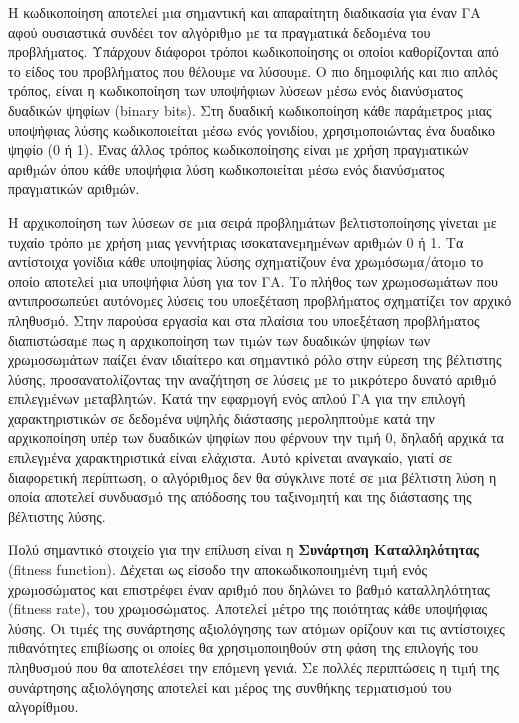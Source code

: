  Η κωδικοποίηση αποτελεί µια σηµαντική και απαραίτητη διαδικασία για έναν ΓΑ αφού ουσιαστικά συνδέει τον αλγόριθµο µε τα πραγµατικά δεδοµένα του προβλήµατος. Υπάρχουν διάφοροι τρόποι κωδικοποίησης οι οποίοι καθορίζονται από το είδος του προβλήµατος που θέλουµε να λύσουµε. Ο πιο δηµοφιλής και πιο απλός τρόπος, είναι η κωδικοποίηση των υποψήφιων λύσεων µέσω ενός διανύσµατος δυαδικών ψηφίων (binary bits). Στη δυαδική κωδικοποίηση κάθε παράµετρος µιας υποψήφιας λύσης κωδικοποιείται µέσω ενός γονιδίου, χρησιµοποιώντας ένα δυαδικο ψηφίο (0 ή 1). Ένας άλλος τρόπος κωδικοποίησης είναι µε χρήση πραγµατικών αριθµών όπου κάθε υποψήφια λύση κωδικοποιείται µέσω ενός διανύσµατος πραγµατικών αριθµών.
 
 Η αρχικοποίηση των λύσεων σε µια σειρά προβληµάτων βελτιστοποίησης γίνεται µε τυχαίο τρόπο µε χρήση µιας γεννήτριας ισοκατανεµηµένων αριθµών 0 ή 1. Τα αντίστοιχα γονίδια κάθε υποψηφίας λύσης σχηµατίζουν ένα χρωµόσωµα/άτοµο το οποίο αποτελεί µια υποψήφια λύση για τον ΓΑ. Το πλήθος των χρωµοσωµάτων που αντιπροσωπεύει αυτόνοµες λύσεις του υποεξέταση προβλήµατος σχηµατίζει τον αρχικό πληθυσµό. Στην παρούσα εργασία και στα πλαίσια του υποεξέταση προβλήµατος διαπιστώσαµε πως η αρχικοποίηση των τιµών των δυαδικών ψηφίων των χρωµοσωµάτων παίζει έναν ιδιαίτερο και σηµαντικό ρόλο στην εύρεση της βέλτιστης λύσης, προσανατολίζοντας την αναζήτηση σε λύσεις µε το µικρότερο δυνατό αριθµό επιλεγµένων µεταβλητών. Κατά την εφαρµογή ενός απλού ΓΑ για την επιλογή χαρακτηριστικών σε δεδοµένα υψηλής διάστασης µεροληπτούµε κατά την αρχικοποίηση υπέρ των δυαδικών ψηφίων που φέρνουν την τιµή 0, δηλαδή αρχικά τα επιλεγµένα χαρακτηριστικά είναι ελάχιστα. Αυτό κρίνεται αναγκαίο, γιατί σε διαφορετική περίπτωση, ο αλγόριθµος δεν θα σύγκλινε ποτέ σε µια βέλτιστη λύση η οποία αποτελεί συνδυασµό της απόδοσης του ταξινοµητή και της διάστασης της βέλτιστης λύσης.
 
 \label{fFunction}
 Πολύ σημαντικό στοιχείο για την επίλυση είναι η \textbf{Συνάρτηση Καταλληλότητας} (fitness function). ∆έχεται ως είσοδο την αποκωδικοποιηµένη τιµή ενός χρωµοσώµατος και επιστρέφει έναν αριθµό που δηλώνει το βαθµό καταλληλότητας (fitness rate), του χρωµοσώµατος. Αποτελεί µέτρο της ποιότητας κάθε υποψήφιας λύσης. Οι τιµές της
 συνάρτησης αξιολόγησης των ατόµων ορίζουν και τις αντίστοιχες πιθανότητες επιβίωσης οι οποίες θα χρησιµοποιηθούν στη φάση της επιλογής του πληθυσµού που θα αποτελέσει την επόµενη γενιά. Σε πολλές περιπτώσεις η τιµή της συνάρτησης αξιολόγησης αποτελεί και µέρος της συνθήκης τερµατισµού του αλγορίθµου.

